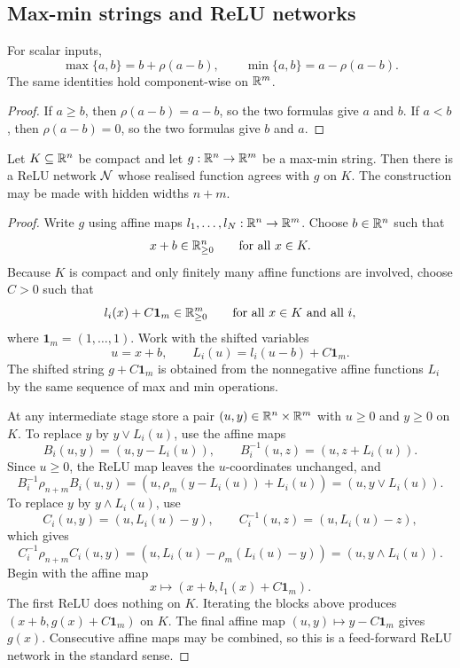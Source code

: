 \subsection{Max-min strings and ReLU networks}

\begin{lemma}
For scalar inputs,
\[
\max\{a,b\}=b+\rho(a-b),
\qquad
\min\{a,b\}=a-\rho(a-b).
\]
The same identities hold component-wise on $\mathbb{R}^m$.
\end{lemma}

\begin{proof}
If $a\geq b$, then $\rho(a-b)=a-b$, so the two formulas give $a$ and $b$.  If $a<b$, then $\rho(a-b)=0$, so the two formulas give $b$ and $a$.
\end{proof}

\begin{lemma}
\label{ai:maxmin_relu}
Let $K\subseteq\mathbb{R}^n$ be compact and let $g:\mathbb{R}^n\to\mathbb{R}^m$ be a max-min string.  Then there is a ReLU network $\mathcal{N}$ whose realised function agrees with $g$ on $K$.  The construction may be made with hidden widths $n+m$.
\end{lemma}

\begin{proof}
Write $g$ using affine maps $l_1,\ldots,l_N:\mathbb{R}^n\to\mathbb{R}^m$.  Choose $b\in\mathbb{R}^n$ such that
\[
x+b\in\mathbb{R}^n_{\geq0}\qquad\text{for all }x\in K.
\]
Because $K$ is compact and only finitely many affine functions are involved, choose $C>0$ such that
\[
l_i(x)+C\mathbf 1_m\in\mathbb{R}^m_{\geq0}
\qquad\text{for all }x\in K\text{ and all }i,
\]
where $\mathbf 1_m=(1,\ldots,1)$.  Work with the shifted variables
\[
u=x+b,
\qquad
L_i(u)=l_i(u-b)+C\mathbf 1_m.
\]
The shifted string $g+C\mathbf 1_m$ is obtained from the nonnegative affine functions $L_i$ by the same sequence of max and min operations.

At any intermediate stage store a pair $(u,y)\in\mathbb{R}^n\times\mathbb{R}^m$ with $u\geq0$ and $y\geq0$ on $K$.  To replace $y$ by $y\vee L_i(u)$, use the affine maps
\[
B_i(u,y)=(u,y-L_i(u)),
\qquad
B_i^{-1}(u,z)=(u,z+L_i(u)).
\]
Since $u\geq0$, the ReLU map leaves the $u$-coordinates unchanged, and
\[
B_i^{-1}\rho_{n+m}B_i(u,y)
=(u,\rho_m(y-L_i(u))+L_i(u))
=(u,y\vee L_i(u)).
\]
To replace $y$ by $y\wedge L_i(u)$, use
\[
C_i(u,y)=(u,L_i(u)-y),
\qquad
C_i^{-1}(u,z)=(u,L_i(u)-z),
\]
which gives
\[
C_i^{-1}\rho_{n+m}C_i(u,y)
=(u,L_i(u)-\rho_m(L_i(u)-y))
=(u,y\wedge L_i(u)).
\]
Begin with the affine map
\[
x\longmapsto (x+b,l_1(x)+C\mathbf 1_m).
\]
The first ReLU does nothing on $K$.  Iterating the blocks above produces $(x+b,g(x)+C\mathbf 1_m)$ on $K$.  The final affine map $(u,y)\mapsto y-C\mathbf 1_m$ gives $g(x)$.  Consecutive affine maps may be combined, so this is a feed-forward ReLU network in the standard sense.
\end{proof}

